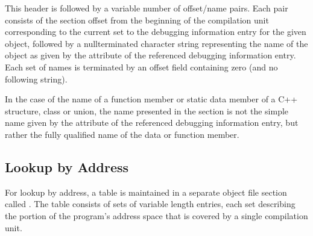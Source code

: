 This header is followed by a variable number of offset/name
pairs. Each pair consists of the section offset from the
beginning of the compilation unit corresponding to the current
set to the debugging information entry for the given object,
followed by a null\dash terminated character string representing
the name of the object as given by the \DWATname{} attribute
of the referenced debugging information entry. Each set of
names is terminated by an offset field containing zero (and
no following string).


In the case of the name of a function member or static data
member of a C++ structure, class or union, the name presented
in the 
\dotdebugpubnames{} 
section is not the simple name given
by the \DWATname{} attribute of the referenced debugging
information entry, but rather the fully qualified name of
the data or function member.

\subsection{Lookup by Address}

For 
lookup by address, a table is maintained in a separate
object file section called 
\dotdebugaranges{}. The table consists
of sets of variable length entries, each set describing the
portion of the program\textquoteright s address space that is covered by
a single compilation unit.

